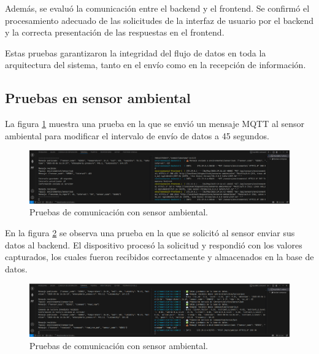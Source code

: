 Además, se evaluó la comunicación entre el backend y el frontend. Se confirmó
el procesamiento adecuado de las solicitudes de la interfaz de usuario por el
backend y la correcta presentación de las respuestas en el frontend.

Estas pruebas garantizaron la integridad del flujo de datos en toda la
arquitectura del sistema, tanto en el envío como en la recepción de
información.

\subsection{Pruebas en sensor ambiental}

La figura \ref{fig:prueba_mqtt_sensor_ambiental_1} muestra una prueba en la que
se envió un mensaje MQTT al sensor ambiental para modificar el intervalo de
envío de datos a 45 segundos.

\begin{figure}[H]
    \centering
    \includegraphics[width=\textwidth]{Images/55_prueba_mqtt_sensor_ambiental_1.png}
    \caption[Pruebas de comunicación con sensor ambiental]{Pruebas de comunicación con sensor ambiental.}
    \label{fig:prueba_mqtt_sensor_ambiental_1}
\end{figure}

En la figura \ref{fig:prueba_mqtt_sensor_ambiental_2} se observa una prueba en
la que se solicitó al sensor enviar sus datos al backend. El dispositivo
procesó la solicitud y respondió con los valores capturados, los cuales fueron
recibidos correctamente y almacenados en la base de datos.

\begin{figure}[H]
    \centering
    \includegraphics[width=\textwidth]{Images/55_prueba_mqtt_sensor_ambiental_2.png}
    \caption[Pruebas de comunicación con sensor ambiental]{Pruebas de comunicación con sensor ambiental.}
    \label{fig:prueba_mqtt_sensor_ambiental_2}
\end{figure}


